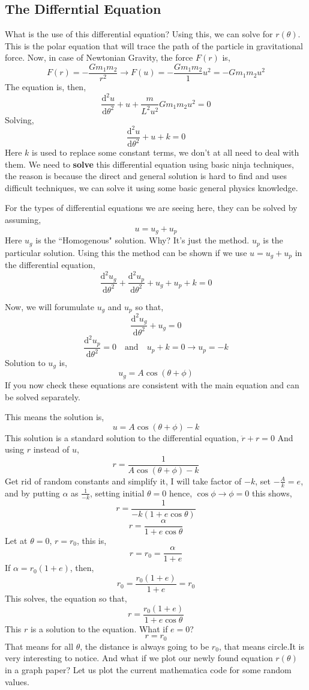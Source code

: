 \documentclass[11pt,a4paper]{article}
\begin{document}
\subsection{ The Differntial Equation }
What is the use of this differential equation? Using this, we can solve for $r(\theta)$. This is the polar equation that will trace the path of the particle in gravitational force. Now, in case of Newtonian Gravity, the force $F(r)$ is, 
\[ 
    F (r) = -\frac{Gm_1m_2}{r^2} \to F(u) = - \frac{Gm_1m_2}{1} u^2 = - G m_1 m_2 u^2
\] 
The equation is, then,
\[ 
\frac{\mathrm{d} ^2 u}{\mathrm{d} \theta^2} + u + \frac{m}{L^2 u^2} G m_1 m_2 u^2 = 0
\]
Solving,
\[ 
\frac{\mathrm{d} ^2 u}{\mathrm{d} \theta ^2} + u + k = 0
\]
Here $k$ is used to replace some constant terms, we don't at all need to deal with them.
We need to \textbf{solve} this differential equation using basic ninja techniques, the reason is because the direct and general solution is hard to find and uses difficult techniques, we can solve it using some basic general physics knowledge.

For the types of differential equations we are seeing here, they can be solved by assuming,
\[ 
u = u_g + u_p
\]
Here $u_g$ is the ``Homogenous" solution. Why? It's just the method. $u_p$ is the particular solution. Using this the method can be shown if we use $u = u_g + u_p$ in the differential equation,
\[ 
\frac{\mathrm{d} ^2u_g}{\mathrm{d} \theta^2} + \frac{\mathrm{d} ^2 u_p}{\mathrm{d} \theta^2} + u_g + u_p + k = 0
\]

Now, we will forumulate $u_g$ and $u_p$ so that,
\[ 
\frac{\mathrm{d} ^2 u_g}{\mathrm{d} \theta^2} + u_g = 0
\]
\[ 
\frac{\mathrm{d} ^2 u_p}{\mathrm{d} \theta^2} = 0 \quad \text{and} \quad u_p + k = 0 \to u_p = -k
\]
Solution to $u_g$ is,
\[ 
    u_g = A \cos(\theta + \phi) 
\] If you now check these equations are consistent with the main equation and can be solved separately. 

This means the solution is,
\[ 
    u = A \cos \left( \theta + \phi \right) - k
\]
This solution is a standard solution to the differential equation, $\ddot{ r }+ r = 0$
And using $r$ instead of $u$,
\[ 
    r = \frac{1}{A \cos \left( \theta + \phi \right) - k}       
\]
Get rid of random constants and simplify it, I will take factor of $-k$, set $-\frac{A}{k} = e$, and by putting $\alpha$ as $\frac{1}{-k}$, setting initial $\theta = 0$ hence, $\cos\phi  \to \phi = 0$ this shows,
\[ 
    r = \frac{1}{-k \left( 1 + e \cos \theta \right) } 
\]
\[ 
r = \frac{\alpha}{1 + e \cos \theta}
\]
Let at $\theta = 0$, $r=r_0$, this is,
\[ 
r = r_0 = \frac{\alpha}{1 + e}
\]
If $\alpha = r_0 \left( 1 + e \right) $, then, 
\[ 
    r_0 = \frac{r_0 \left( 1 + e \right) }{1 + e} = r_0
\]
This solves, the equation so that, 
\[ 
    \boxed{ r = \frac{r_0 \left( 1 + e \right) }{1 + e \cos \theta}}
\]
This $r$ is a solution to the equation. What if $e=0$? 
\[ 
r = r_0 
\] That means for all  $\theta$, the distance is always going to be $r_0$, that means circle.It is very interesting to notice. And what if we plot our newly found equation $r(\theta)$ in a graph paper? Let us plot the current mathematica code for some random values.
\end{document}
